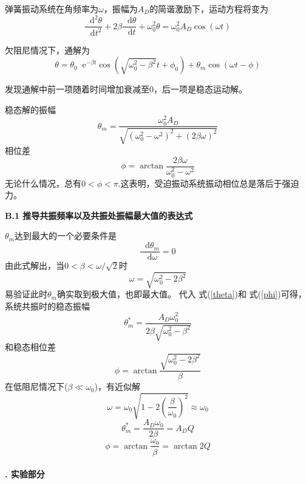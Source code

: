 \documentclass[a4paper,11pt]{article}
\newcommand*{\dif}{\mathop{}\!\mathrm{d}}
\newcommand*{\e}{\mathop{}\!\mathrm{e}}
\begin{document}
        弹簧振动系统在角频率为$\omega$，振幅为$A_D$的简谐激励下，运动方程将变为
        \begin{equation}
            \frac{\dif^2 \theta}{\dif t^2} + 2\beta \frac{\dif \theta}{\dif t} + \omega_0^2 \theta = \omega_0^2 A_D\cos(\omega t)
        \end{equation}

        欠阻尼情况下，通解为
        \begin{equation}
            \theta = \theta_0 \e^{-\beta t} \cos (\sqrt{\omega_0^2 - \beta^2}t + \phi_0) + \theta_m \cos(\omega t - \phi)
        \end{equation}

        发现通解中前一项随着时间增加衰减至0，后一项是稳态运动解。

        稳态解的振幅
        \begin{equation}
            \theta_m = \frac{\omega_0^2 A_D}{\sqrt{(\omega_0^2 - \omega^2)^2 + (2\beta\omega)^2}}
            \label{theta}
        \end{equation}
        相位差
        \begin{equation}
            \phi = \arctan \frac{2\beta\omega}{\omega_0^2-\omega^2}
            \label{phi}
        \end{equation}
        无论什么情况，总有$0<\phi<\pi$.这表明，受迫振动系统振动相位总是落后于强迫力。

        \textbf{B.1 推导共振频率以及共振处振幅最大值的表达式}

        $\theta_m$达到最大的一个必要条件是
        \begin{equation}
            \frac{\dif \theta_m}{\dif \omega} = 0
        \end{equation}
        由此式解出，当$0<\beta<\omega / \sqrt2$时
        \begin{equation}
            \omega = \sqrt{\omega_0^2 - 2\beta^2}
        \end{equation}
        易验证此时$\theta_m$确实取到极大值，也即最大值。
        代入 式(\ref{theta})和 式(\ref{phi})可得，系统共振时的稳态振幅
        \begin{equation}
            \theta^*_m = \frac{A_D\omega_0^2}{2\beta\sqrt{\omega_0^2-\beta^2}}
        \end{equation}
        和稳态相位差
        \begin{equation}
            \phi = \arctan \frac{\sqrt{\omega_0^2-2\beta^2}}\beta
        \end{equation}
        在低阻尼情况下($\beta \ll \omega_0$)，有近似解
        \begin{equation}
            \omega = \omega_0\sqrt{1-2(\frac\beta{\omega_0})^2} \approx \omega_0
        \end{equation}
        \begin{equation}
            \theta^*_m = \frac{A_D\omega_0}{2\beta} = A_D Q
        \end{equation}
        \begin{equation}
            \phi = \arctan \frac{\omega_0}{\beta} = \arctan 2Q
        \end{equation}
    ~\\
    \textbf{. 实验部分}
\end{document}
